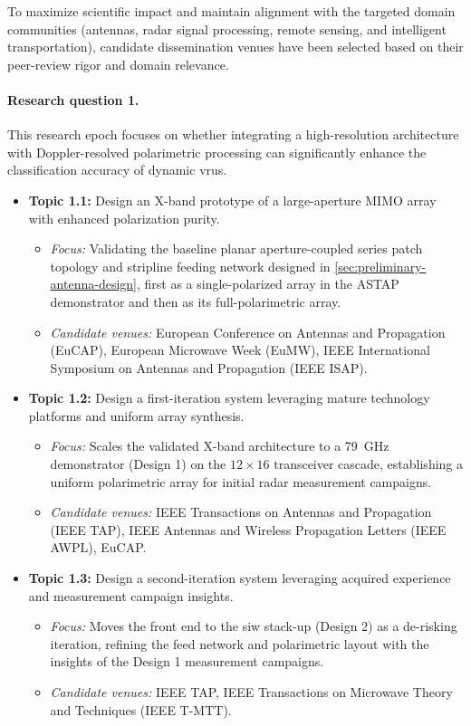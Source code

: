To maximize scientific impact and maintain alignment with the targeted domain communities (antennas, radar signal processing, remote sensing, and intelligent transportation), candidate dissemination venues have been selected based on their peer-review rigor and domain relevance.

\paragraph{Research question 1.}
This research epoch focuses on whether integrating a high-resolution architecture with Doppler-resolved polarimetric processing can significantly enhance the classification accuracy of dynamic \glspl{vru}.
\begin{itemize}
    \item \textbf{Topic 1.1:} Design an X-band prototype of a large-aperture MIMO array with enhanced polarization purity.
    \begin{itemize}
        \item \textit{Focus:} Validating the baseline planar aperture-coupled series patch topology and stripline feeding network designed in \cref{sec:preliminary-antenna-design}, first as a single-polarized array in the ASTAP demonstrator and then as its full-polarimetric array.
        \item \textit{Candidate venues:} European Conference on Antennas and Propagation (EuCAP), European Microwave Week (EuMW), IEEE International Symposium on Antennas and Propagation (IEEE ISAP).
    \end{itemize}

    \item \textbf{Topic 1.2:} Design a first-iteration system leveraging mature technology platforms and uniform array synthesis.
    \begin{itemize}
        \item \textit{Focus:} Scales the validated X-band architecture to a \qty{79}{\giga\hertz} demonstrator (Design 1) on the $12 \times 16$ transceiver cascade, establishing a uniform polarimetric array for initial radar measurement campaigns.
        \item \textit{Candidate venues:} IEEE Transactions on Antennas and Propagation (IEEE TAP), IEEE Antennas and Wireless Propagation Letters (IEEE AWPL), EuCAP.
    \end{itemize}

    \item \textbf{Topic 1.3:} Design a second-iteration system leveraging acquired experience and measurement campaign insights.
    \begin{itemize}
        \item \textit{Focus:} Moves the front end to the \gls{siw} stack-up (Design 2) as a de-risking iteration, refining the feed network and polarimetric layout with the insights of the Design 1 measurement campaigns.
        \item \textit{Candidate venues:} IEEE TAP, IEEE Transactions on Microwave Theory and Techniques (IEEE T-MTT).
    \end{itemize}
\end{itemize}

